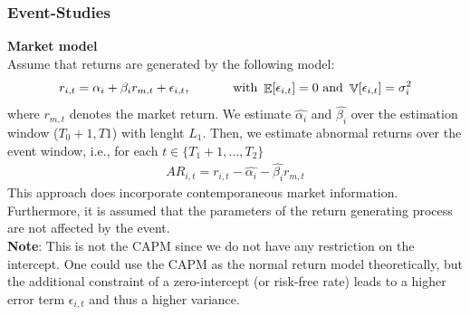 \documentclass[xcolor=dvipsnames, english, 8pt]{beamer}
\DeclareMathOperator{\E}{\mathbb{E}}
\DeclareMathOperator{\V}{\mathbb{V}}
\begin{document}
        \begin{frame}
            \frametitle{Event-Studies}
        \textbf{\color{ubRed}Market model}\vspace{0.25cm}\\
        Assume that returns are generated by the following model:
        \begin{align}
            r_{i,t} = \alpha_i + \beta_i r_{m,t} + \epsilon_{i,t} \text{, \hspace{1cm} with } \E[\epsilon_{i,t}] =0 \text{ and } \V[\epsilon_{i,t}]=\sigma_i^2
        \end{align}
        where $r_{m,t}$ denotes the market return. We estimate $\hat{\alpha_i}$ and $\hat{\beta_i}$ over the {\color{ubRed} estimation window} ($T_0+1,T1$) with lenght $L_1$. Then, we estimate abnormal returns over the {\color{ubRed} event window}, i.e., for each $t\in\{T_1+1,\hdots,T_2\}$
        \begin{align}
            AR_{i,t} = r_{i,t} - \hat{\alpha_i} - \hat{\beta_i} r_{m,t}
        \end{align}
        This approach  {\color{ubRed} does incorporate contemporaneous market information}. Furthermore, it is assumed that the parameters of the return generating process are not affected by the event.\vspace{0.5cm}\\

        \textbf{\color{ubRed}Note}: This is not the CAPM since we do not have any restriction on the intercept. One could use the CAPM as the normal return model theoretically, but the additional constraint of a zero-intercept (or risk-free rate) leads to a higher error term $\epsilon_{i,t}$ and thus a higher variance.
        \end{frame}
\end{document}
